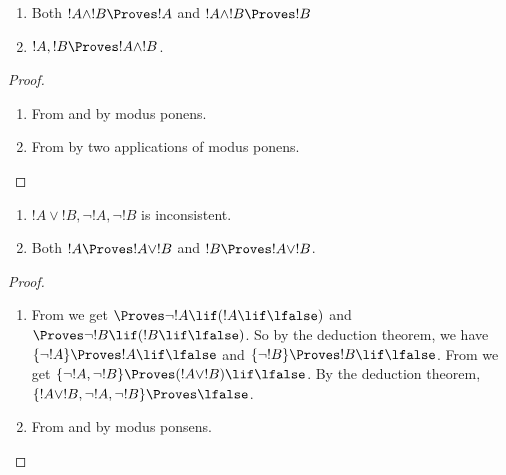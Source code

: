 \documentclass[../../../include/open-logic-section]{subfiles}
\begin{document}
      {}
      {}


\begin{prop}
  \begin{enumerate}
  \item {} Both $!A \land !B \Proves
    !A$ and $!A \land !B \Proves !B$
  \item {} $!A, !B \Proves !A \land !B$.
  \end{enumerate}
\end{prop}

\begin{proof}
  \begin{enumerate}
    \item From  and  by
      modus ponens.
  \item From  by two applications of
    modus ponens.
  \end{enumerate}
\end{proof}


\begin{prop}
  \begin{enumerate}
  \item $!A \lor !B, \lnot !A, \lnot !B$ is inconsistent.
  \item Both $!A \Proves !A \lor !B$ and $!B \Proves !A \lor !B$.
  \end{enumerate}
\end{prop}

\begin{proof}
  \begin{enumerate}
  \item From  we get $\Proves \lnot !A \lif (!A
    \lif \lfalse)$ and $\Proves \lnot !B \lif (!B \lif \lfalse)$. So
    by the deduction theorem, we have $\{\lnot !A\} \Proves !A \lif
    \lfalse$ and $\{\lnot !B\} \Proves !B \lif \lfalse$. From
     we get $\{\lnot !A, \lnot !B\} \Proves (!A
    \lor !B) \lif \lfalse$. By the deduction theorem, $\{!A \lor !B,
    \lnot !A, \lnot !B\} \Proves \lfalse$.
  \item From  and  by modus
    ponsens.
  \end{enumerate}
\end{proof}
\end{document}
